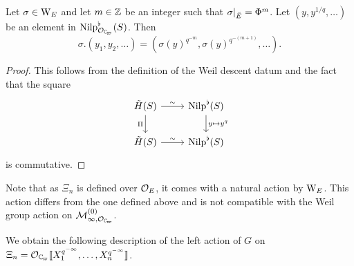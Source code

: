 \documentclass[../main.tex]{subfiles}
\begin{document}
\begin{lem}\label{lem:ExplicitWeilGroupActionOnTildeH}
  Let $\sigma \in \mathrm W_E$ and let $m \in \mathbb{Z}$ be an integer such that
  $\sigma|_{\breve {E}} = \Phi^m$. Let $(y, y^{1/q}, \dots)$ be an element in
  $\Nilp_{\cO_\Cp}^\flat(S)$.
  Then
  \begin{equation*}
    \sigma.(y_1, y_2, \dots) = (\sigma(y)^{q^{-m}}, \sigma(y)^{q^{-(m+1)}}, \dots).
  \end{equation*}
\begin{proof}
  This follows from the definition of the Weil descent datum and the fact that 
  the square
  \begin{equation*}
    \begin{tikzcd}[ampersand replacement=\&]
    	{\tilde H(S)} \& {\Nilp^\flat(S)} \\
    	{\tilde H(S)} \& {\Nilp^\flat(S)}
    	\arrow["\sim", from=1-1, to=1-2]
    	\arrow["\Pi"', from=1-1, to=2-1]
    	\arrow["{y \mapsto y^q}", from=1-2, to=2-2]
    	\arrow["\sim", from=2-1, to=2-2]
    \end{tikzcd}
  \end{equation*}
  is commutative.
\end{proof}
\end{lem}
\begin{rmk} 
  Note that  as $\Xi_n$ is defined over $\mathcal{O}_E$, it comes with a natural action
  by $\mathrm W_E$. This action differs from the one defined above and is not
  compatible with the Weil group action on $\cM_{\infty, \cO_\Cp}^{(0)}$.
\end{rmk}

We obtain the following description of the left action of $G$ on $\Xi_n = 
\cO_\Cp\llbr X_1^{q^{-\infty}}, \dots, X_n^{q^{-\infty}}\rrbr$.
\end{document}
